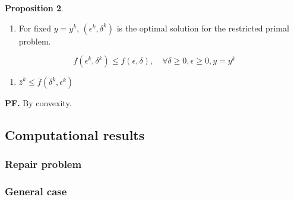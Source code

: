 \documentclass[
  a4paper,
,tablecaptionabove
]{scrartcl}
\numberwithin{equation}{section}
\providecommand{\tightlist}{%
  \setlength{\itemsep}{0pt}\setlength{\parskip}{0pt}}
\begin{document}






\textbf{Proposition 2}.

\begin{enumerate}
  \def\labelenumi{(\alph{enumi})}
  \tightlist
  \item
        For fixed \(y=y^k\), \((\epsilon^k, \delta^k)\) is the optimal
        solution for the restricted primal problem.
\end{enumerate}

\[f(\epsilon^k, \delta^k) \le f(\epsilon, \delta), \quad \forall \delta\ge 0, \epsilon\ge 0, y= y^k\]

\begin{enumerate}
  \def\labelenumi{(\alph{enumi})}
  \setcounter{enumi}{1}
  \tightlist
  \item
        \(\bar z^k \le \bar f(\delta^k, \epsilon^k)\)
\end{enumerate}

\textbf{PF.} By convexity.

\hypertarget{computational-results}{%
  \subsection{Computational results}\label{computational-results}}

\hypertarget{repair-problem}{%
  \subsubsection{Repair problem}\label{repair-problem}}

\hypertarget{general-case}{%
  \subsubsection{General case}\label{general-case}}


\hypertarget{refs}{}


\end{document}

